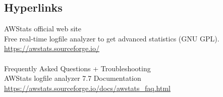 
\subsection{Hyperlinks}


AWStats official web site\\
Free real-time logfile analyzer to get advanced statistics (GNU GPL).\\
\href{https://awstats.sourceforge.io/}{https://awstats.sourceforge.io/}\\
\\
Frequently Asked Questions + Troubleshooting\\
AWStats logfile analyzer 7.7 Documentation\\
\href{https://awstats.sourceforge.io/docs/awstats\_faq.html}{https://awstats.sourceforge.io/docs/awstats\_faq.html}
